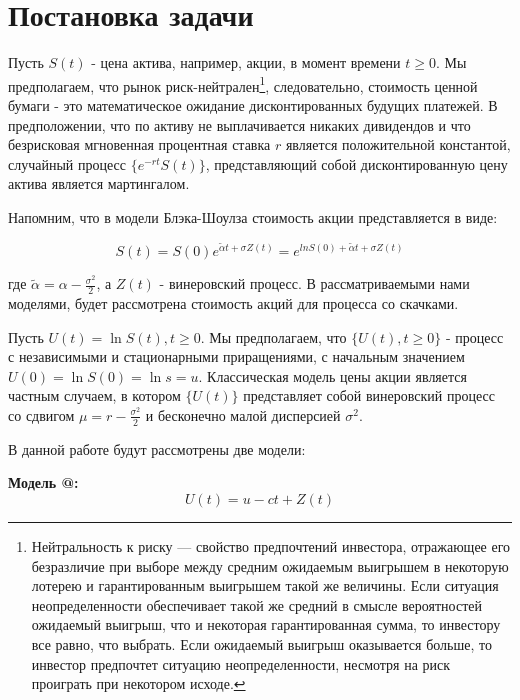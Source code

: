 \documentclass[a4paper,12pt]{article}
\makeatletter
\theoremstyle{definition}
\newcommand*{\rom}[1]{\expandafter\@slowromancap\romannumeral #1@}
\makeatother
\begin{document}

\section{Постановка задачи}

Пусть $S(t)$ - цена актива, например, акции, в момент времени $t \ge 0$. Мы предполагаем, что рынок риск-нейтрален\footnote{Нейтральность к риску — свойство предпочтений инвестора, отражающее его безразличие при выборе между средним ожидаемым выигрышем в некоторую лотерею и гарантированным выигрышем такой же величины. Если ситуация неопределенности обеспечивает такой же средний в смысле вероятностей ожидаемый выигрыш, что и некоторая гарантированная сумма, то инвестору все равно, что выбрать. Если ожидаемый выигрыш оказывается больше, то инвестор предпочтет ситуацию неопределенности, несмотря на риск проиграть при некотором исходе.}, следовательно, стоимость ценной бумаги - это математическое ожидание дисконтированных будущих платежей. В предположении, что по активу не выплачивается никаких дивидендов и что безрисковая мгновенная процентная ставка $r$ является положительной константой, случайный процесс $\{e^{-rt} S(t)\}$, представляющий собой дисконтированную цену актива  является мартингалом.

Напомним, что в модели Блэка-Шоулза стоимость акции представляется в виде:

\begin{equation}\label{eq:black_sholes_equation}
    S(t) = S(0) e^{\tilde{\alpha} t + \sigma Z(t)} = e^{ln S(0) + \tilde{\alpha} t + \sigma Z(t)}
\end{equation}

где $\tilde{\alpha} = \alpha - \frac{\sigma^2}{2}$, а $Z (t)$ - винеровский процесс. В рассматриваемыми нами моделями, будет рассмотрена стоимость акций для процесса со скачками.

Пусть $U(t) = \ln{S(t)}, t \ge 0$. Мы предполагаем, что $\{U(t), t \ge 0\}$ - процесс с независимыми и стационарными приращениями, с начальным значением $U(0) = \ln{S(0)} = \ln{s} = u$. Классическая модель цены акции является частным случаем, в котором $\{U(t)\}$ представляет собой винеровский процесс со сдвигом $\mu = r - \frac{\sigma ^ {2}}{2}$ и бесконечно малой дисперсией $\sigma ^ {2}$. 

В данной работе будут рассмотрены две модели:

\textbf{Модель \rom{1}:}
\begin{equation}\label{eq:model1_definition}
    U(t) = u - ct + Z(t)
\end{equation}
\end{document}
